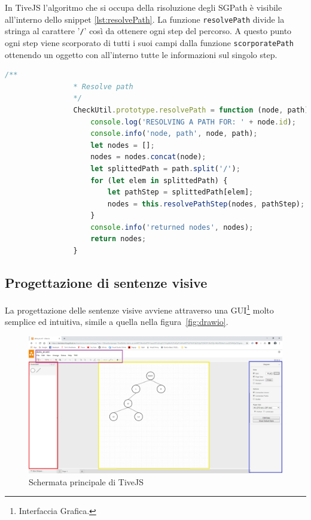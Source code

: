             In TiveJS l'algoritmo che si occupa della risoluzione degli SGPath è visibile all'interno dello snippet \ref{lst:resolvePath}. La funzione \texttt{resolvePath} divide la stringa al carattere '\texttt{/}' così da ottenere ogni step del percorso. A questo punto ogni step viene scorporato di tutti i suoi campi dalla funzione \texttt{scorporatePath} ottenendo un oggetto con all'interno tutte le informazioni sul singolo step.
            \begin{lstlisting}[language=JavaScript,caption=\textbf{Funzione che si occupa della risoluzione delle path},label={lst:resolvePath}]
                /**
                * Resolve path
                */
                CheckUtil.prototype.resolvePath = function (node, path) {
                    console.log('RESOLVING A PATH FOR: ' + node.id);
                    console.info('node, path', node, path);
                    let nodes = [];
                    nodes = nodes.concat(node);
                    let splittedPath = path.split('/');
                    for (let elem in splittedPath) {
                        let pathStep = splittedPath[elem];
                        nodes = this.resolvePathStep(nodes, pathStep);
                    }
                    console.info('returned nodes', nodes);
                    return nodes;
                }
            \end{lstlisting}
        
        \subsection{Progettazione di sentenze visive}
            La progettazione delle sentenze visive avviene attraverso una GUI\footnote{Interfaccia Grafica.} molto semplice ed intuitiva, simile a quella nella figura~\ref{fig:drawio}.

            \begin{figure}[htbp]
                \centering
                \includegraphics[scale=0.25]{Figure/tivejs_gui2.png}
                \caption{Schermata principale di TiveJS}
                \label{fig:tivejsgui}
            \end{figure}


